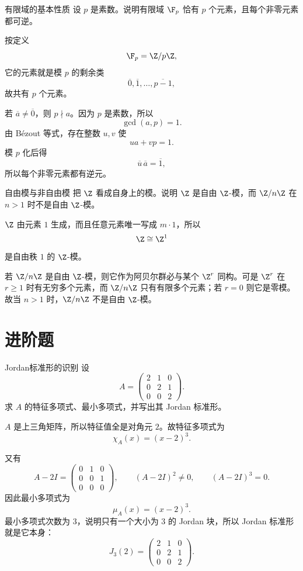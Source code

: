 \begin{problem}{有限域的基本性质}
\easy
设 $p$ 是素数。说明有限域 $\F_p$ 恰有 $p$ 个元素，且每个非零元素都可逆。
\end{problem}
\begin{solution}
按定义
\[
\F_p=\Z/p\Z,
\]
它的元素就是模 $p$ 的剩余类
\[
\overline0,\overline1,\dots,\overline{p-1},
\]
故共有 $p$ 个元素。

若 $\overline a\neq\overline0$，则 $p\nmid a$。因为 $p$ 是素数，所以
\[
\gcd(a,p)=1.
\]
由 Bézout 等式，存在整数 $u,v$ 使
\[
ua+vp=1.
\]
模 $p$ 化后得
\[
\overline u\,\overline a=\overline1,
\]
所以每个非零元素都有逆元。
\end{solution}

\begin{problem}{自由模与非自由模}
\easy
把 $\Z$ 看成自身上的模。说明 $\Z$ 是自由 $\Z$-模，而 $\Z/ n\Z$ 在 $n>1$ 时不是自由 $\Z$-模。
\end{problem}
\begin{solution}
$\Z$ 由元素 $1$ 生成，而且任意元素唯一写成 $m\cdot1$，所以
\[
\Z\cong \Z^1
\]
是自由秩 $1$ 的 $\Z$-模。

若 $\Z/n\Z$ 是自由 $\Z$-模，则它作为阿贝尔群必与某个 $\Z^r$ 同构。可是 $\Z^r$ 在 $r\ge1$ 时有无穷多个元素，而 $\Z/n\Z$ 只有有限多个元素；若 $r=0$ 则它是零模。故当 $n>1$ 时，$\Z/n\Z$ 不是自由 $\Z$-模。
\end{solution}

\section{进阶题 \medium}

\begin{problem}{Jordan标准形的识别}
\medium
设
\[
A=\begin{pmatrix}
2&1&0\\0&2&1\\0&0&2
\end{pmatrix}.
\]
求 $A$ 的特征多项式、最小多项式，并写出其 Jordan 标准形。
\end{problem}
\begin{solution}
$A$ 是上三角矩阵，所以特征值全是对角元 $2$。故特征多项式为
\[
\chi_A(x)=(x-2)^3.
\]

又有
\[
A-2I=
\begin{pmatrix}
0&1&0\\0&0&1\\0&0&0
\end{pmatrix},
\qquad
(A-2I)^2\neq0,
\qquad
(A-2I)^3=0.
\]
因此最小多项式为
\[
\mu_A(x)=(x-2)^3.
\]
最小多项式次数为 $3$，说明只有一个大小为 $3$ 的 Jordan 块，所以 Jordan 标准形就是它本身：
\[
J_3(2)=
\begin{pmatrix}
2&1&0\\0&2&1\\0&0&2
\end{pmatrix}.
\]
\end{solution}

